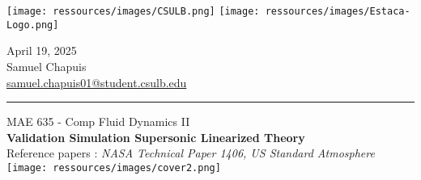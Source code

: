 \documentclass{article}
\begin{document}
\noindent
\begin{minipage}[t]{0.5\textwidth}
  \vspace{0pt}
  \texttt{[image: ressources/images/CSULB.png]}\hspace{0.3cm}
  \texttt{[image: ressources/images/Estaca-Logo.png]}
  \bigskip
\end{minipage}
\begin{minipage}[t]{0.5\textwidth}
  \vspace{8pt}
  \raggedleft
  April 19, 2025 \\
  Samuel Chapuis \\
  \href{mailto:samuel.chapuis01@student.csulb.edu}{samuel.chapuis01@student.csulb.edu} 
\end{minipage}




\rule{\linewidth}{1pt}

\begin{center}
	{\large MAE 635 - Comp Fluid Dynamics II} %
		\\[1.5cm]
		{\LARGE \textbf{Validation Simulation Supersonic Linearized Theory}} %
		\\[0.5cm]
		Reference papers : \textit{NASA Technical Paper 1406, US Standard Atmosphere}\\[2.5cm]

		\center 
		\texttt{[image: ressources/images/cover2.png]}
\end{center}

\newpage




\tableofcontents



\end{document}
